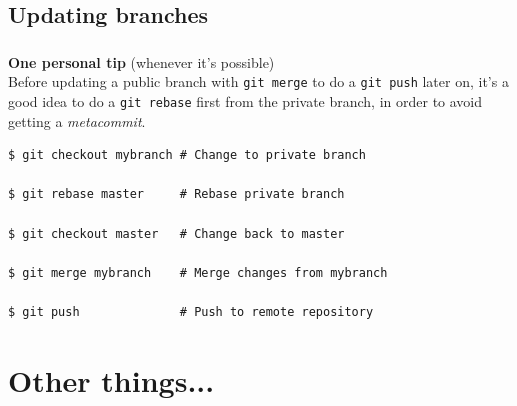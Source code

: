 \begin{frame}[fragile]
\begin{center}
  \end{center}

\end{frame}


\subsection{Updating branches}

\begin{frame}[fragile]
  \frametitle{\insertsubsection}

  \vspacing
  {\Large \textbf{One personal tip} (whenever it's possible)}\\
  \vspacing Before updating a public branch with \texttt{git merge} to
  do a \texttt{git push} later on, it's a good idea to do a
  \texttt{git rebase} first from the private branch, in order to avoid
  getting a \textit{metacommit}.

  \begin{small}
\begin{verbatim}
$ git checkout mybranch # Change to private branch

$ git rebase master     # Rebase private branch

$ git checkout master   # Change back to master

$ git merge mybranch    # Merge changes from mybranch

$ git push              # Push to remote repository
\end{verbatim}
  \end{small}
\end{frame}


\section{Other things...}

